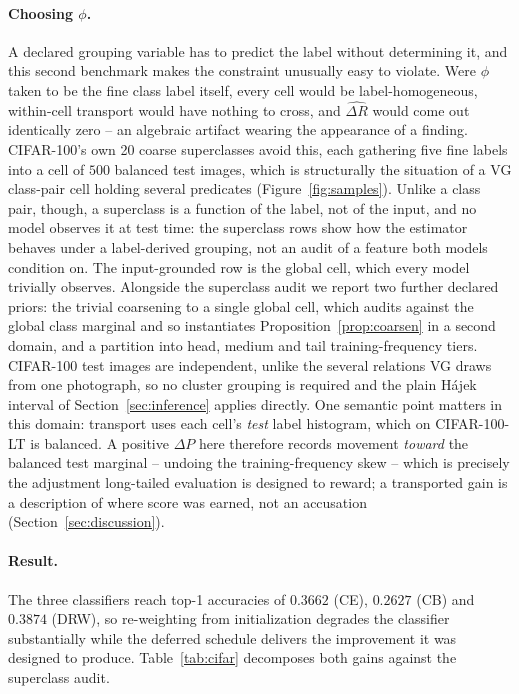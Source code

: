\paragraph{Choosing $\phi$.} A declared grouping variable has to predict the label without
determining it, and this second benchmark makes the constraint unusually easy to
violate. Were $\phi$ taken to be the fine class label itself, every cell would be
label-homogeneous, within-cell transport would have nothing to cross, and
$\widehat{\Delta R}$ would come out identically zero -- an algebraic artifact wearing the
appearance of a finding. CIFAR-100's own 20 coarse superclasses avoid this, each
gathering five fine labels into a cell of $500$ balanced test images, which is
structurally the situation of a VG class-pair cell holding several predicates
(Figure~\ref{fig:samples}). Unlike a class pair, though, a superclass is a function of the
label, not of the input, and no model observes it at test time: the superclass rows show how
the estimator behaves under a label-derived grouping, not an audit of a feature both models
condition on. The input-grounded row is the global cell, which every model trivially
observes. Alongside the superclass audit we report two further
declared priors: the trivial coarsening to a single global cell, which audits against
the global class marginal and so instantiates Proposition~\ref{prop:coarsen} in a second
domain, and a partition into head, medium and tail training-frequency tiers. CIFAR-100
test images are independent, unlike the several relations VG draws from one photograph,
so no cluster grouping is required and the plain H\'ajek interval of
Section~\ref{sec:inference} applies directly. One semantic point matters in this domain:
transport uses each cell's \emph{test} label histogram, which on CIFAR-100-LT is
balanced. A positive $\Delta P$ here therefore records movement \emph{toward} the
balanced test marginal -- undoing the training-frequency skew -- which is precisely the
adjustment long-tailed evaluation is designed to reward; a transported gain is a
description of where score was earned, not an accusation
(Section~\ref{sec:discussion}).

\paragraph{Result.} The three classifiers reach top-1 accuracies of $0.3662$ (CE),
$0.2627$ (CB) and $0.3874$ (DRW), so re-weighting from initialization degrades the
classifier substantially while the deferred schedule delivers the improvement it was
designed to produce. Table~\ref{tab:cifar} decomposes both gains against the superclass
audit.


